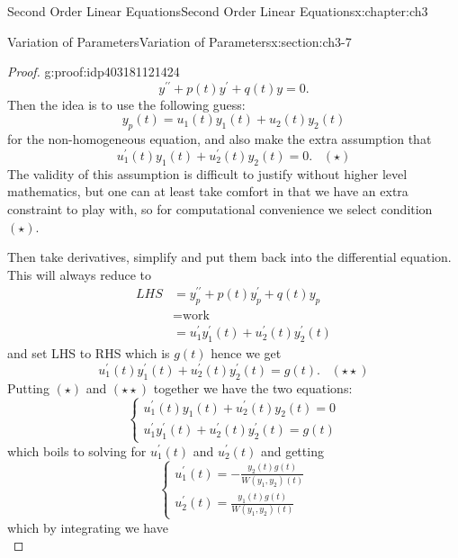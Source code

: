 \documentclass[oneside,10pt,]{book}
\numberwithin{equation}{section}
\numberwithin{equation}{section}
\newcommand{\amp}{&}
\begin{document}
\begin{chapterptx}{Second Order Linear Equations}{}{Second Order Linear Equations}{}{}{x:chapter:ch3}
\begin{sectionptx}{Variation of Parameters}{}{Variation of Parameters}{}{}{x:section:ch3-7}
\begin{proof}{}{g:proof:idp403181121424}
\begin{equation*}
y^{\prime\prime}+p(t)y^{\prime}+q(t)y=0.
\end{equation*}
Then the idea is to use the following guess:%
\begin{equation*}
y_{p}(t)=u_{1}(t)y_{1}(t)+u_{2}(t)y_{2}(t)
\end{equation*}
for the non-homogeneous equation, and also make the extra assumption that%
\begin{equation*}
u_{1}^{\prime}(t)y_{1}(t)+u_{2}^{\prime}(t)y_{2}(t)=0.\,\,\,\,\,(\star)
\end{equation*}
The validity of this assumption is difficult to justify without higher level mathematics, but one can at least take comfort in that we have an extra constraint to play with, so for computational convenience we select condition \((\star)\).%
\par
Then take derivatives, simplify and put them back into the differential equation. This will always reduce to%
\begin{align*}
LHS \amp =y_{p}^{\prime\prime}+p(t)y_{p}^{\prime}+q(t)y_{p}\\
\amp =\text{work}\\
\amp =u_{1}^{\prime}y_{1}^{\prime}(t)+u_{2}^{\prime}(t)y_{2}^{\prime}(t)
\end{align*}
and set LHS to RHS which is \(g(t)\) hence we get%
\begin{equation*}
u_{1}^{\prime}(t)y_{1}^{\prime}(t)+u_{2}^{\prime}(t)y_{2}^{\prime}(t)=g(t).\,\,\,\,\,(\star\star)
\end{equation*}
Putting \((\star)\) and \((\star\star)\) together we have the two equations:%
\begin{equation*}
\begin{cases}
u_{1}^{\prime}(t)y_{1}(t)+u_{2}^{\prime}(t)y_{2}(t)=0\\
u_{1}^{\prime}y_{1}^{\prime}(t)+u_{2}^{\prime}(t)y_{2}^{\prime}(t)=g(t)
\end{cases}
\end{equation*}
which boils to solving for \(u_{1}^{\prime}(t)\) and \(u_{2}^{\prime}(t)\) and getting%
\begin{equation*}
\begin{cases}
u_{1}^{\prime}(t)=-\frac{y_{2}(t)g(t)}{W\left(y_{1},y_{2}\right)(t)}\\
u_{2}^{\prime}(t)=\frac{y_{1}(t)g(t)}{W\left(y_{1},y_{2}\right)(t)}
\end{cases}
\end{equation*}
which by integrating we have%
\begin{equation*}

\end{equation*}
\end{proof}
\end{sectionptx}
\end{chapterptx}
\end{document}
